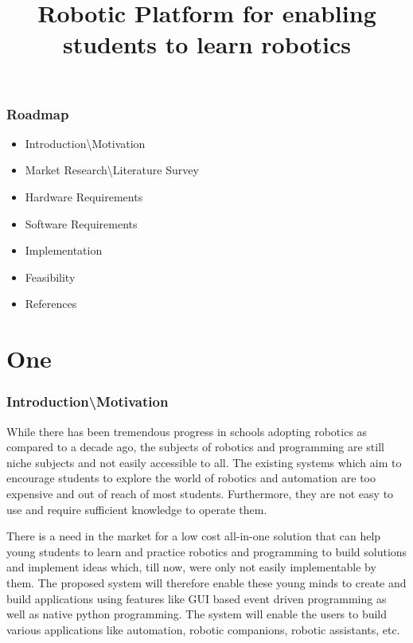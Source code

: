 \documentclass{beamer}
\title{Robotic Platform for enabling students to learn robotics}
\begin{document}
  
\maketitle

\begin{frame}
\frametitle{Roadmap}
\begin{itemize}
\item Introduction\textbackslash Motivation
\item Market Research\textbackslash Literature Survey
\item Hardware Requirements
\item Software Requirements
\item Implementation
\item Feasibility
\item References
\end{itemize}
\end{frame}
  
\section{One}  
\begin{frame}
\frametitle{Introduction\textbackslash Motivation}
\begin{center}
\justifying
While there has been tremendous progress in schools adopting robotics as compared to a decade ago, the subjects of robotics and programming are still niche subjects and not easily accessible to all. The existing systems which aim to encourage students to explore the world of robotics and automation are too expensive and out of reach of most students. Furthermore, they are not easy to use and require sufficient knowledge to operate them.

There is a need in the market for a low cost all-in-one solution that can help young students to learn and practice robotics and programming to build solutions and implement ideas which, till now, were only not easily implementable by them. The proposed system will therefore enable these young minds to create and build applications using features like GUI based event driven programming as well as native python programming. The system will enable the users to build various applications like automation, robotic companions, robotic assistants, etc.
\end{center}
\end{frame}  
\end{document}
